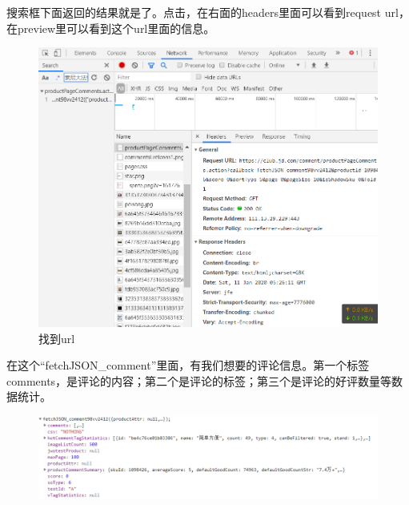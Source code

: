 搜索框下面返回的结果就是了。点击，在右面的headers里面可以看到request url，在preview里可以看到这个url里面的信息。
\begin{figure}[htbp]
\centering
\includegraphics[width=13.5cm]{TIM图片20200111133155.png}
\caption{找到url} %
\end{figure}

在这个“fetchJSON_comment”里面，有我们想要的评论信息。第一个标签comments，是评论的内容；第二个是评论的标签；第三个是评论的好评数量等数据统计。
\begin{figure}[htbp]
\centering
\includegraphics[width=13.5cm]{TIM图片20200111133649.png}
\end{figure}



